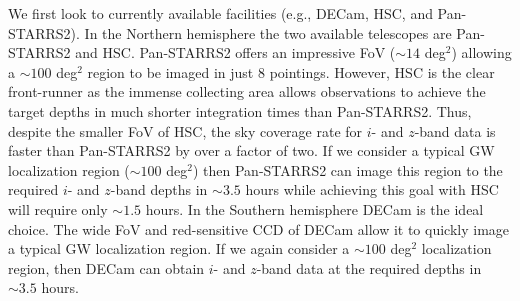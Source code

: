 We first look to currently available facilities (e.g., DECam, HSC, and Pan-STARRS2). In the Northern hemisphere the two available telescopes are Pan-STARRS2 and HSC. Pan-STARRS2 offers an impressive FoV ($\sim14$ deg$^2$) allowing a $\sim100$ deg$^2$ region to be imaged in just $8$ pointings. However, HSC is the clear front-runner as  the immense collecting area allows observations to achieve the target depths in much shorter integration times than Pan-STARRS2. Thus, despite the smaller FoV of HSC, the sky coverage rate for $i$- and $z$-band data is faster than Pan-STARRS2 by over a factor of two. If we consider a typical GW localization region ($\sim 100$ deg$^2$) then Pan-STARRS2 can image this region to the required $i$- and $z$-band depths in $\sim 3.5$ hours while achieving this goal with HSC will require only $\sim1.5$ hours. In the Southern hemisphere DECam is the ideal choice. The wide FoV and red-sensitive CCD of DECam allow it to quickly image a typical GW localization region. If we again consider a $\sim100$ deg$^2$  localization region, then DECam can obtain $i$- and $z$-band data at the required depths in $\sim3.5$ hours.

